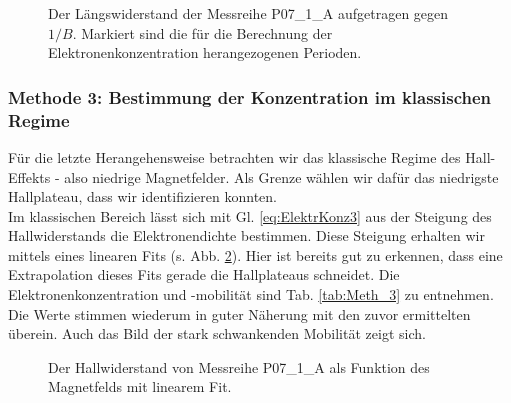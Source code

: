 \begin{figure}[htbp]
	\centering
	
	\caption{Der Längswiderstand der Messreihe P07\_1\_A aufgetragen gegen $1/B$. Markiert sind die für die Berechnung der Elektronenkonzentration herangezogenen Perioden.}
	\label{abb:P07_Meth_2}
\end{figure}

\begin{table}[h!]
	\centering
	\caption{Bei Messreihe P07\_1\_A betrachtete reziproke Minima der SdH-Oszilflation, sowie die zugehörigen Differenzen $\Delta_{1/B}$ und Elektronenkonzentrationen $n_e$.}
	
	\label{tab:P07_Meth_2}
\end{table}

\begin{table}[h!]
	\centering
	\caption{Mit Methode 2 aus dem Längswiderstand $R_{xx}(B)$ bestimmtef Elektronenkonzentrationen $n_e$, die Standardabweichungen $\Delta n_e$ sowie die Elektronenmobilitäten $\mu_e$.}
	
	\label{tab:Meth_2}
\end{table}
\newpage
\subsubsection{Methode 3: Bestimmung der Konzentration im klassischen Regime}
Für die letzte Herangehensweise betrachten wir das klassische Regime des Hall-Effekts - also niedrige Magnetfelder. Als Grenze wählen wir dafür das niedrigste Hallplateau, dass wir identifizieren konnten.\\

Im klassischen Bereich lässt sich mit Gl. \ref{eq:ElektrKonz3} aus der Steigung des Hallwiderstands die Elektronendichte bestimmen. Diese Steigung erhalten wir mittels eines linearen Fits (s. Abb. \ref{abb:P07_Meth_3}). Hier ist bereits gut zu erkennen, dass eine Extrapolation dieses Fits gerade die Hallplateaus schneidet. Die Elektronenkonzentration und -mobilität sind Tab. \ref{tab:Meth_3} zu entnehmen. Die Werte stimmen wiederum in guter Näherung mit den zuvor ermittelten überein. Auch das Bild der stark schwankenden Mobilität zeigt sich.
\begin{figure}[htbp]
	\centering
	
	\caption{Der Hallwiderstand von Messreihe P07\_1\_A  als Funktion des Magnetfelds mit linearem Fit. }
	\label{abb:P07_Meth_3}
\end{figure}

